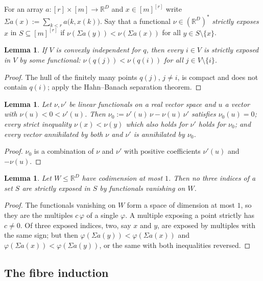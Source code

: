 \documentclass[11pt,a4paper]{article}
\theoremstyle{plain}
\newtheorem{lemma}[theorem]{Lemma}
\theoremstyle{definition}
\newcommand{\R}{\mathbb{R}}
\begin{document}
For an array $a\colon[r]\times[m]\to\R^D$ and $x\in[m]^{[r]}$ write
$\Sigma a(x):=\sum_{k<r}a\bigl(k,x(k)\bigr)$. Say that a functional $\nu\in(\R^D)^{*}$
\emph{strictly exposes} $x$ in $S\subseteq[m]^{[r]}$ if $\nu(\Sigma a(y))<\nu(\Sigma a(x))$ for
all $y\in S\setminus\{x\}$.

\begin{lemma}\label{lem:expose}
If $V$ is convexly independent for $q$, then every $i\in V$ is strictly exposed in $V$ by some
functional: $\nu(q(j))<\nu(q(i))$ for all $j\in V\setminus\{i\}$.
\end{lemma}

\begin{proof}
The hull of the finitely many points $q(j)$, $j\ne i$, is compact and does not contain $q(i)$;
apply the Hahn--Banach separation theorem.
\end{proof}

\begin{lemma}\label{lem:combine}
Let $\nu,\nu'$ be linear functionals on a real vector space and $u$ a vector with $\nu(u)<0<\nu'(u)$.
Then $\nu_0:=\nu'(u)\,\nu-\nu(u)\,\nu'$ satisfies $\nu_0(u)=0$; every strict inequality
$\nu(x)<\nu(y)$ which also holds for $\nu'$ holds for $\nu_0$; and every vector annihilated by both
$\nu$ and $\nu'$ is annihilated by $\nu_0$.
\end{lemma}

\begin{proof}
$\nu_0$ is a combination of $\nu$ and $\nu'$ with positive coefficients $\nu'(u)$ and $-\nu(u)$.
\end{proof}

\begin{lemma}\label{lem:twopoints}
Let $W\le\R^D$ have codimension at most $1$. Then no three indices of a set $S$ are strictly
exposed in $S$ by functionals vanishing on $W$.
\end{lemma}

\begin{proof}
The functionals vanishing on $W$ form a space of dimension at most $1$, so they are the multiples
$c\,\varphi$ of a single $\varphi$. A multiple exposing a point strictly has $c\ne0$. Of three
exposed indices, two, say $x$ and $y$, are exposed by multiples with the same sign; but then
$\varphi(\Sigma a(y))<\varphi(\Sigma a(x))$ and $\varphi(\Sigma a(x))<\varphi(\Sigma a(y))$, or
the same with both inequalities reversed.
\end{proof}

\subsection{The fibre induction}
\end{document}
